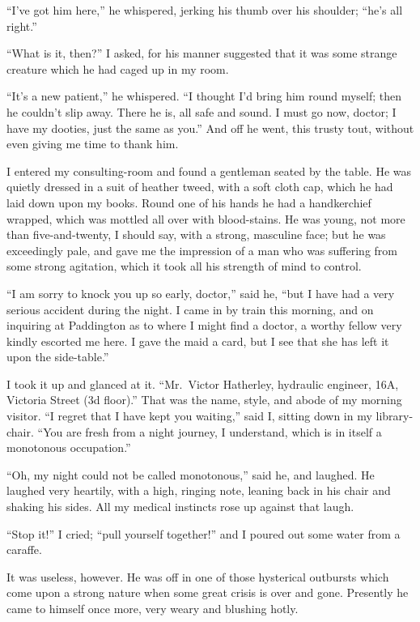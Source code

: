 “I’ve got him here,” he whispered, jerking his thumb over
his shoulder; “he’s all right.”

“What is it, then?” I asked, for his manner suggested that
it was some strange creature which he had caged up in my
room.

“It’s a new patient,” he whispered. “I thought I’d bring
him round myself; then he couldn’t slip away. There he is,
all safe and sound. I must go now, doctor; I have my dooties,
just the same as you.” And off he went, this trusty
tout, without even giving me time to thank him.

I entered my consulting-room and found a gentleman seated
by the table. He was quietly dressed in a suit of heather
tweed, with a soft cloth cap, which he had laid down upon
my books. Round one of his hands he had a handkerchief
wrapped, which was mottled all over with blood-stains. He
was young, not more than five-and-twenty, I should say, with
a strong, masculine face; but he was exceedingly pale, and
gave me the impression of a man who was suffering from
some strong agitation, which it took all his strength of mind
to control.

“I am sorry to knock you up so early, doctor,” said he,
“but I have had a very serious accident during the night. I
came in by train this morning, and on inquiring at
Paddington as to where I might find a doctor, a worthy fellow very
kindly escorted me here. I gave the maid a card, but I see
that she has left it upon the side-table.”

I took it up and glanced at it. “Mr.~Victor Hatherley, hydraulic
engineer, 16\textsc{A}, Victoria Street (3d floor).” That was
the name, style, and abode of my morning visitor. “I regret
that I have kept you waiting,” said I, sitting down in my
library-chair. “You are fresh from a night journey, I understand,
which is in itself a monotonous occupation.”

“Oh, my night could not be called monotonous,” said he,
and laughed. He laughed very heartily, with a high, ringing
note, leaning back in his chair and shaking his sides. All my
medical instincts rose up against that laugh.

“Stop it!” I cried; “pull yourself together!” and I poured
out some water from a caraffe.

It was useless, however. He was off in one of those hysterical
outbursts which come upon a strong nature when some
great crisis is over and gone. Presently he came to himself
once more, very weary and blushing hotly.

